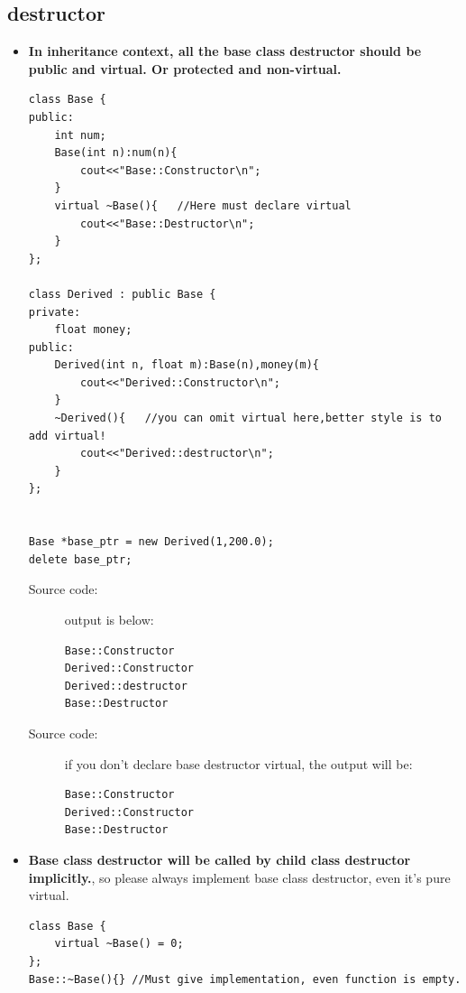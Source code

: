 \documentclass[a4paper,11pt,twoside]{book}
\begin{document}
\subsection{destructor}
\begin{itemize}
	\item \textbf{In inheritance context, all the base class destructor should be public and virtual. Or protected and non-virtual.}  

\begin{lstlisting}[numbers=none]
class Base {
public:
	int num;
	Base(int n):num(n){
		cout<<"Base::Constructor\n";
	}
	virtual ~Base(){   //Here must declare virtual
		cout<<"Base::Destructor\n";
	}
};

class Derived : public Base {
private:
	float money;
public:
	Derived(int n, float m):Base(n),money(m){
		cout<<"Derived::Constructor\n";
	}
	~Derived(){   //you can omit virtual here,better style is to add virtual!
		cout<<"Derived::destructor\n";
	}
};


Base *base_ptr = new Derived(1,200.0);
delete base_ptr;
\end{lstlisting}

\begin{description}
	\item[Source code:] output is below: 
\begin{verbatim}
Base::Constructor                                                                                               
Derived::Constructor
Derived::destructor                                                                        
Base::Destructor 
\end{verbatim}
		\item[Source code:] if you don't declare base destructor virtual, the output will be:
\begin{verbatim}
Base::Constructor                                                                                               
Derived::Constructor                                                                        
Base::Destructor 
\end{verbatim}
	
\end{description}

	\item \textbf{Base class destructor will be called by child class destructor implicitly.}, so please always implement base class destructor, even it's pure virtual. 
\begin{lstlisting}[numbers=none]
class Base {
	virtual ~Base() = 0;
};
Base::~Base(){} //Must give implementation, even function is empty. 
\end{lstlisting}	
	

\end{itemize}
\end{document}
